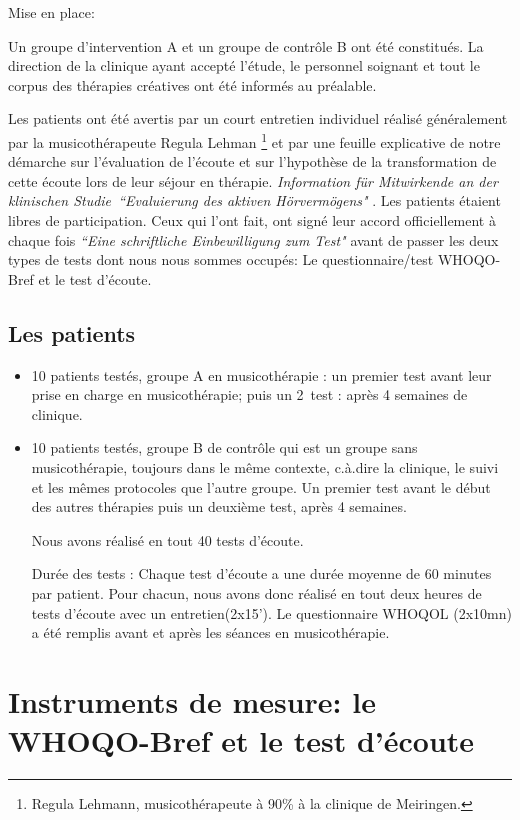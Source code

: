 Mise en place:

Un groupe d'intervention A et un groupe de contrôle B ont été constitués.
La direction de la clinique ayant accepté l'étude, le personnel soignant et tout le
corpus des thérapies créatives ont  été
informés au préalable.

Les patients ont été avertis par un
court entretien individuel réalisé généralement par la musicothérapeute Regula Lehman  \footnote{Regula
  Lehmann, musicothérapeute  à 90\%  à la clinique de Meiringen.} et par  une
feuille explicative de notre démarche sur  l'évaluation de l'écoute et
sur
l'hypothèse de la transformation de cette écoute lors de leur 
séjour en thérapie. \emph{Information für Mitwirkende an der klinischen
  Studie\  ``Evaluierung des aktiven Hörvermögens" }.
Les patients étaient libres de participation. Ceux qui
l'ont fait, ont signé leur accord  officiellement à chaque fois  \emph{``Eine schriftliche Einbewilligung zum
Test"} avant de passer les deux types de tests dont nous nous sommes
occupés: Le questionnaire/test WHOQO-Bref et le test d'écoute.

 
 \subsection{Les patients}
 

\begin{itemize}
	\item 10 patients testés, groupe A en musicothérapie : un
          premier test avant leur prise en charge en musicothérapie;
          puis un 2\ieme\ test : après 4 semaines de
          clinique.
	\item 10 patients testés, groupe B de contrôle qui est un groupe sans musicothérapie,
	toujours dans le même contexte, c.à.dire la clinique, le suivi et les mêmes protocoles que l'autre groupe. Un premier test avant
	le début des autres thérapies puis un deuxième test, après 4 semaines. 
	
	Nous avons réalisé en tout 40 tests d'écoute. 
	
	Durée des tests : Chaque test d'écoute a une durée  moyenne de
        60 minutes par patient. Pour chacun, nous avons donc réalisé
        en tout deux heures de tests d'écoute avec un
        entretien(2x15').
        Le questionnaire WHOQOL (2x10mn)  a été remplis avant et après
        les séances en musicothérapie.
\end{itemize}

\section{Instruments de mesure: le WHOQO-Bref et le test d'écoute}
 

